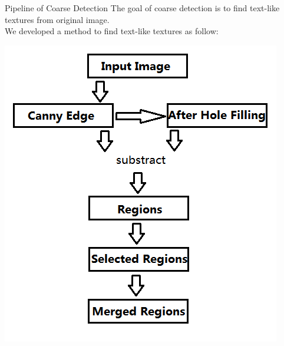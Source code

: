 \documentclass[a0paper,portrait]{baposter}
\begin{document}
\begin{poster}
\begin{posterbox}[name=pipeline,column=0,below=text,above=bottom]{Pipeline of Coarse Detection}
The goal of coarse detection is to find text-like textures from original image.\\
We developed a method to find text-like textures as follow:\\
\begin{center}
  \includegraphics[width=1.8\headerheight]{pipeline}
  \label{fig:figlabel}
\end{center}

\end{posterbox}



















\end{poster}
\end{document}
